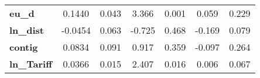 \begin{center}
\begin{tabular}{lcccccc}
\textbf{eu\_d}                                            &       0.1440  &        0.043     &     3.366  &         0.001        &        0.059    &        0.229     \\
\textbf{ln\_dist}                                         &      -0.0454  &        0.063     &    -0.725  &         0.468        &       -0.169    &        0.079     \\
\textbf{contig}                                           &       0.0834  &        0.091     &     0.917  &         0.359        &       -0.097    &        0.264     \\
\textbf{ln\_Tariff}                                       &       0.0366  &        0.015     &     2.407  &         0.016        &        0.006    &        0.067     \\
\bottomrule
\end{tabular}
\end{center}
